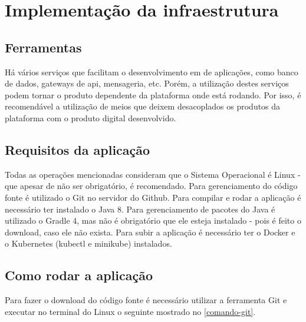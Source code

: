 \chapter{Implementação da infraestrutura}\label{implementação-da-infraestrutura}

\section{Ferramentas}\label{ferramentas}


Há vários serviços que facilitam o desenvolvimento em de aplicações, como banco de dados,
gateways de api, mensageria, etc. Porém, a utilização destes serviços podem
tornar o produto dependente da plataforma onde está rodando. Por isso, é recomendável
a utilização de meios que deixem desacoplados os produtos da plataforma com o produto
digital desenvolvido.





\section{Requisitos da aplicação}\label{requisitos-da-aplicacao}

Todas as operações mencionadas consideram que o Sistema Operacional é Linux
- que apesar de não ser obrigatório, é recomendado.
Para gerenciamento do código fonte é utilizado o Git no servidor do Github.
Para compilar e rodar a aplicação é necessário ter instalado o Java 8.
Para gerenciamento de pacotes do Java é utilizado o Gradle 4, mas não
é obrigatório que ele esteja instalado - pois é feito o download, caso
ele não exista. Para subir a aplicação é necessário ter o Docker e o
Kubernetes (kubectl e minikube) instalados.


\section{Como rodar a aplicação}\label{como-rodar-a-aplicacao}

Para fazer o download do código fonte é necessário utilizar a ferramenta Git
e executar no terminal do Linux o seguinte mostrado no \autoref{comando-git}.



